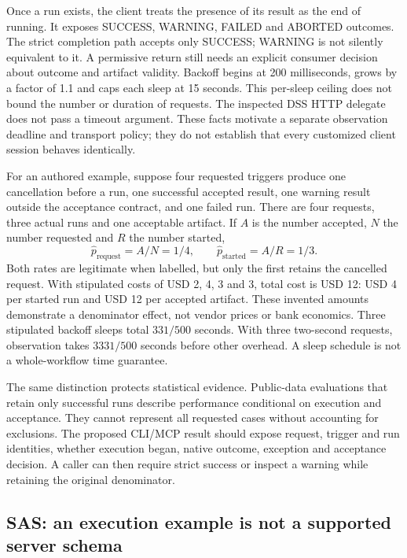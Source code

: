 Once a run exists, the client treats the presence of its result as the end
of running. It exposes SUCCESS, WARNING, FAILED and ABORTED outcomes.
The strict completion path accepts only SUCCESS; WARNING is not silently
equivalent to it. A permissive return still needs an explicit consumer
decision about outcome and artifact validity. Backoff begins at 200
milliseconds, grows by a factor of 1.1 and caps each sleep at 15 seconds.
This per-sleep ceiling does not bound the number or duration of requests.
The inspected DSS HTTP delegate does not pass a timeout argument. These
facts motivate a separate observation deadline and transport policy; they
do not establish that every customized client session behaves identically.
\citep{exec24_workflow_contracts_dataiku}

For an authored example, suppose four requested triggers produce one
cancellation before a run, one successful accepted result, one warning
result outside the acceptance contract, and one failed run. There are four
requests, three actual runs and one acceptable artifact. If $A$ is the
number accepted, $N$ the number requested and $R$ the number started,
\begin{equation}
  \widehat p_{\mathrm{request}}=A/N=1/4,
  \qquad \widehat p_{\mathrm{started}}=A/R=1/3.
  \label{eq:exec24-workflow-denominator}
\end{equation}
Both rates are legitimate when labelled, but only the first retains the
cancelled request. With stipulated costs of USD 2, 4, 3 and 3, total cost
is USD 12: USD 4 per started run and USD 12 per accepted artifact. These
invented amounts demonstrate a denominator effect, not vendor prices or
bank economics. Three stipulated backoff sleeps total $331/500$ seconds.
With three two-second requests, observation takes $3331/500$ seconds before
other overhead. A sleep schedule is not a whole-workflow time guarantee.
\citep{exec24_workflow_contracts_reference}

The same distinction protects statistical evidence. Public-data evaluations
that retain only successful runs describe performance conditional on
execution and acceptance. They cannot represent all requested cases without
accounting for exclusions. The proposed CLI/MCP result should expose request,
trigger and run identities, whether execution began, native outcome,
exception and acceptance decision. A caller can then require strict success
or inspect a warning while retaining the original denominator.

\subsection{SAS: an execution example is not a supported server schema}

